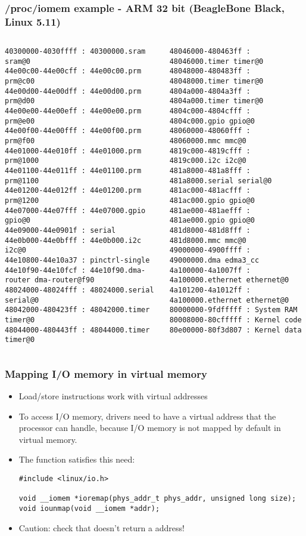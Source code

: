 \begin{frame}[fragile]
  \frametitle{/proc/iomem example - ARM 32 bit (BeagleBone Black, Linux 5.11)}
  \tiny
  \begin{columns}
  \begin{verbatim}
40300000-4030ffff : 40300000.sram sram@0
44e00c00-44e00cff : 44e00c00.prm prm@c00
44e00d00-44e00dff : 44e00d00.prm prm@d00
44e00e00-44e00eff : 44e00e00.prm prm@e00
44e00f00-44e00fff : 44e00f00.prm prm@f00
44e01000-44e010ff : 44e01000.prm prm@1000
44e01100-44e011ff : 44e01100.prm prm@1100
44e01200-44e012ff : 44e01200.prm prm@1200
44e07000-44e07fff : 44e07000.gpio gpio@0
44e09000-44e0901f : serial
44e0b000-44e0bfff : 44e0b000.i2c i2c@0
44e10800-44e10a37 : pinctrl-single
44e10f90-44e10fcf : 44e10f90.dma-router dma-router@f90
48024000-48024fff : 48024000.serial serial@0
48042000-480423ff : 48042000.timer timer@0
48044000-480443ff : 48044000.timer timer@0
\end{verbatim}
  \begin{verbatim}
48046000-480463ff : 48046000.timer timer@0
48048000-480483ff : 48048000.timer timer@0
4804a000-4804a3ff : 4804a000.timer timer@0
4804c000-4804cfff : 4804c000.gpio gpio@0
48060000-48060fff : 48060000.mmc mmc@0
4819c000-4819cfff : 4819c000.i2c i2c@0
481a8000-481a8fff : 481a8000.serial serial@0
481ac000-481acfff : 481ac000.gpio gpio@0
481ae000-481aefff : 481ae000.gpio gpio@0
481d8000-481d8fff : 481d8000.mmc mmc@0
49000000-4900ffff : 49000000.dma edma3_cc
4a100000-4a1007ff : 4a100000.ethernet ethernet@0
4a101200-4a1012ff : 4a100000.ethernet ethernet@0
80000000-9fdfffff : System RAM
80008000-80cfffff : Kernel code
80e00000-80f3d807 : Kernel data
\end{verbatim}
  \end{columns}
\end{frame}

\begin{frame}[fragile]
  \frametitle{Mapping I/O memory in virtual memory}
  \begin{itemize}
  \item Load/store instructions work with virtual addresses
  \item To access I/O memory, drivers need to have a virtual address
    that the processor can handle, because I/O memory is not mapped by
    default in virtual memory.
  \item The  function satisfies this need:
\begin{verbatim}
#include <linux/io.h>

void __iomem *ioremap(phys_addr_t phys_addr, unsigned long size);
void iounmap(void __iomem *addr);
\end{verbatim}
  \item Caution: check that  doesn't return a  address!
  \end{itemize}
\end{frame}

